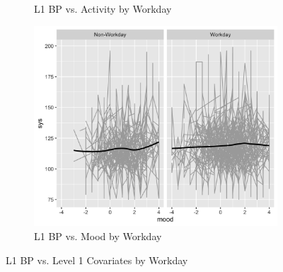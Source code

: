 \documentclass[12pt,twoside,letterpaper]{article}
\theoremstyle{definition}
\theoremstyle{definition}
\begin{document}
\begin{appendices}
\begin{figure}
\begin{subfigure}{0.32\textwidth}
            \caption{{\small L1 BP vs. Activity by Workday}}
            \label{fig: bp by act and day}
        \end{subfigure}
        \hfill
        \begin{subfigure}{0.32\textwidth}
            \centering
            \includegraphics[width=\textwidth]{pics/bp v mood and day facet.png}
            \caption{{\small L1 BP vs. Mood by Workday}}
            \label{fig: bp by mood and day}
        \end{subfigure}
        \caption{{\small L1 BP vs. Level 1 Covariates by Workday}}
        \label{fig: bp by level1 and day2}
    \end{figure}


\end{appendices}
\end{document}
